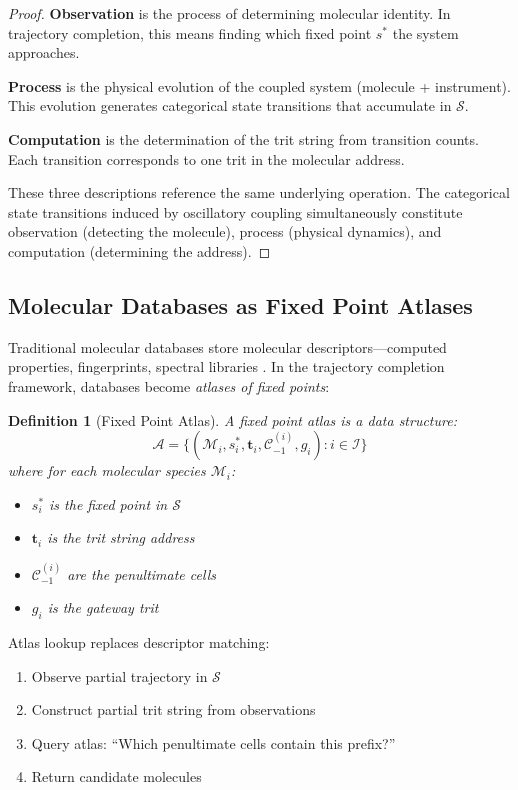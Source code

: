 \documentclass[twocolumn,10pt,a4paper]{article}
\newtheorem{definition}[theorem]{Definition}
\newcommand{\Sspace}{\mathcal{S}}
\begin{document}
\begin{proof}
\textbf{Observation} is the process of determining molecular identity. In trajectory completion, this means finding which fixed point $s^*$ the system approaches.

\textbf{Process} is the physical evolution of the coupled system (molecule + instrument). This evolution generates categorical state transitions that accumulate in $\Sspace$.

\textbf{Computation} is the determination of the trit string from transition counts. Each transition corresponds to one trit in the molecular address.

These three descriptions reference the same underlying operation. The categorical state transitions induced by oscillatory coupling simultaneously constitute observation (detecting the molecule), process (physical dynamics), and computation (determining the address).
\end{proof}

\subsection{Molecular Databases as Fixed Point Atlases}

Traditional molecular databases store molecular descriptors---computed properties, fingerprints, spectral libraries \citep{weininger1988smiles, bolton2008pubchem}. In the trajectory completion framework, databases become \emph{atlases of fixed points}:

\begin{definition}[Fixed Point Atlas]
A \emph{fixed point atlas} is a data structure:
\begin{equation}
\mathcal{A} = \{(\mathcal{M}_i, s^*_i, \mathbf{t}_i, \mathcal{C}_{-1}^{(i)}, g_i) : i \in \mathcal{I}\}
\end{equation}
where for each molecular species $\mathcal{M}_i$:
\begin{itemize}
    \item $s^*_i$ is the fixed point in $\Sspace$
    \item $\mathbf{t}_i$ is the trit string address
    \item $\mathcal{C}_{-1}^{(i)}$ are the penultimate cells
    \item $g_i$ is the gateway trit
\end{itemize}
\end{definition}

Atlas lookup replaces descriptor matching:
\begin{enumerate}
    \item Observe partial trajectory in $\Sspace$
    \item Construct partial trit string from observations
    \item Query atlas: ``Which penultimate cells contain this prefix?''
    \item Return candidate molecules
\end{enumerate}
\end{document}
